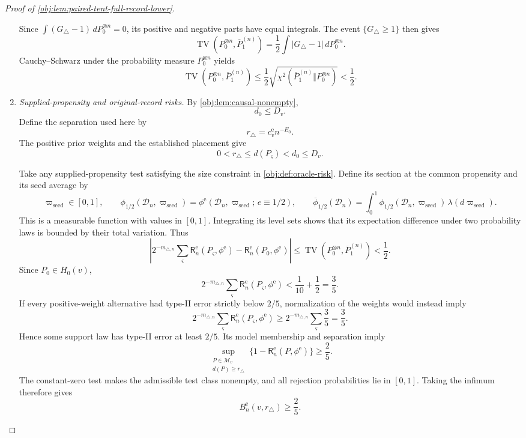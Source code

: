 \begin{proof}[Proof of \cref{obj:lem:paired-tent-full-record-lower}]
\begin{enumerate}
Since \(\int(G_\triangle-1)\,dP_0^{\otimes n}=0\), its positive and negative
parts have equal integrals. The event \(\{G_\triangle\ge1\}\) then gives
\[
\operatorname{TV}(P_0^{\otimes n},\overline P_1^{(n)})
=
\frac12\int|G_\triangle-1|\,dP_0^{\otimes n}.
\]
Cauchy--Schwarz under the probability measure \(P_0^{\otimes n}\) yields
\[
\operatorname{TV}(P_0^{\otimes n},\overline P_1^{(n)})
\le
\frac12
\sqrt{\chi^2(\overline P_1^{(n)}\Vert P_0^{\otimes n})}
<\frac12.
\]

\item \emph{Supplied-propensity and original-record risks.}
By \cref{obj:lem:causal-nonempty},
\[
d_0\le D_v.
\]
Define the separation used here by
\[
r_\triangle=c_v^{\mathrm e}n^{-E_0}.
\]
The positive prior weights and the established placement give
\[
0<r_\triangle\le d(P_\varsigma)<d_0\le D_v.
\]

Take any supplied-propensity test satisfying the size constraint in
\cref{obj:def:oracle-risk}. Define its section at the common propensity and
its seed average by
\[
\varpi_{\mathrm{seed}}\in[0,1],
\qquad
\phi_{1/2}(\mathcal D_n,\varpi_{\mathrm{seed}})
=
\phi^{\mathrm e}(\mathcal D_n,\varpi_{\mathrm{seed}};\,e\equiv1/2),
\qquad
\overline\phi_{1/2}(\mathcal D_n)
=
\int_0^1\phi_{1/2}(\mathcal D_n,\varpi_{\mathrm{seed}})\,\lambda(d\varpi_{\mathrm{seed}}).
\]
This is a measurable function with values in \([0,1]\). Integrating its level
sets shows that its expectation difference under two probability laws is
bounded by their total variation. Thus
\[
\left|
2^{-m_{\triangle,n}}\sum_\varsigma
\mathsf R_n^{\mathrm e}(P_\varsigma,\phi^{\mathrm e})
-
\mathsf R_n^{\mathrm e}(P_0,\phi^{\mathrm e})
\right|
\le
\operatorname{TV}(P_0^{\otimes n},\overline P_1^{(n)})
<\frac12.
\]
Since \(P_0\in H_0(v)\),
\[
2^{-m_{\triangle,n}}\sum_\varsigma
\mathsf R_n^{\mathrm e}(P_\varsigma,\phi^{\mathrm e})
<\frac1{10}+\frac12=\frac35.
\]
If every positive-weight alternative had type-II error strictly below
\(2/5\), normalization of the weights would instead imply
\[
2^{-m_{\triangle,n}}\sum_\varsigma
\mathsf R_n^{\mathrm e}(P_\varsigma,\phi^{\mathrm e})
\ge
2^{-m_{\triangle,n}}\sum_\varsigma\frac35
=\frac35.
\]
Hence some support law has type-II error at least \(2/5\). Its model
membership and separation imply
\[
\sup_{\substack{P\in\mathcal M_v\\d(P)\ge r_\triangle}}
\bigl\{1-\mathsf R_n^{\mathrm e}(P,\phi^{\mathrm e})\bigr\}
\ge\frac25.
\]
The constant-zero test makes the admissible test class nonempty, and all
rejection probabilities lie in \([0,1]\). Taking the infimum therefore gives
\[
B_n^{\mathrm e}(v,r_\triangle)\ge\frac25.
\]


\end{enumerate}
\end{proof}
